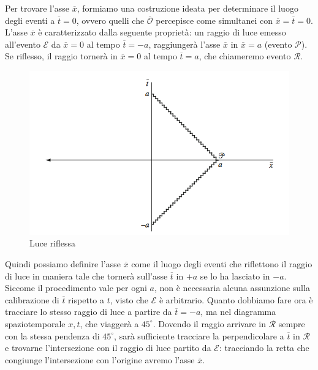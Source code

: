 \documentclass[a4paper,11pt]{book}
\theoremstyle{plain}
\theoremstyle{definition}
\begin{document}
Per trovare l'asse $\overline{x}$, formiamo una costruzione ideata per determinare il luogo degli eventi a $\overline{t}=0$, ovvero quelli che $\mathcal{\overline{O}}$ percepisce come simultanei con $\overline{x}=\overline{t}=0$. L'asse $\overline{x}$ è caratterizzato dalla seguente proprietà: un raggio di luce emesso all'evento $\mathcal{E}$ da $\overline{x}=0$ al tempo $\overline{t}=-a$, raggiungerà l'asse $\overline{x}$ in $\overline{x}=a$ (evento $\mathcal{P}$). Se riflesso, il raggio tornerà in $\overline{x}=0$ al tempo $\overline{t}=a$, che chiameremo evento $\mathcal{R}$. 
\begin{figure}[!h]
\centering
\includegraphics[scale=0.45]{x}
\caption{Luce riflessa}
\end{figure}
Quindi possiamo definire l'asse $\overline{x}$ come il luogo degli eventi che riflettono il raggio di luce in maniera tale che tornerà sull'asse $\overline{t}$ in $+a$ se lo ha lasciato in $-a$. Siccome il procedimento vale per ogni $a$, non è necessaria alcuna assunzione sulla calibrazione di $\overline{t}$ rispetto a $t$, visto che $\mathcal{E}$ è arbitrario.  Quanto dobbiamo fare ora è tracciare lo stesso raggio di luce a partire da $\overline{t}=-a$, ma nel diagramma spaziotemporale $x,t$, che viaggerà a $45^{\circ}$. Dovendo il raggio arrivare in $\mathcal{R}$ sempre con la stessa pendenza di $45^{\circ}$, sarà sufficiente tracciare la perpendicolare a $\overline{t}$ in $\mathcal{R}$ e trovarne l'intersezione con il raggio di luce partito da $\mathcal{E}$: tracciando la retta che congiunge l'intersezione con l'origine avremo l'asse $\overline{x}$. 
\end{document}
